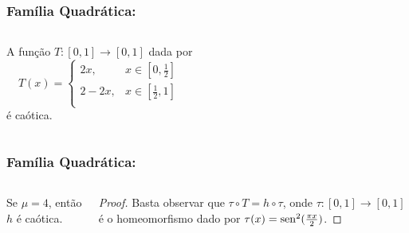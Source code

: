 \begin{frame}
\vspace{5pt}
\frametitle{Família Quadrática: \subsecname}
\begin{columns}
\column{\dimexpr\paperwidth-15pt}

\begin{lemma}
A função $T: [0,1] \to [0,1]$ dada por
\[ T(x) =
  \begin{cases}
    2x, & x \in \left[ 0, \frac{1}{2} \right] \\
    2 - 2x, & x \in \left[ \frac{1}{2}, 1 \right] \\
  \end{cases}
\]
é caótica.
\end{lemma}

\end{columns}
\end{frame}


\begin{frame}
\vspace{5pt}
\frametitle{Família Quadrática: \subsecname}
\begin{columns}
\column{\dimexpr\paperwidth-15pt}

\begin{theorem}
Se $\mu = 4$, então $h$ é caótica.
\end{theorem}

\begin{proof}
Basta observar que $\tau \circ T = h \circ \tau$, onde $\tau: [0, 1] \to [0, 1]$ é o homeomorfismo dado por $\tau(x) = \operatorname{sen}^2(\frac{\pi x}{2})$.
\end{proof}

\end{columns}
\end{frame}

